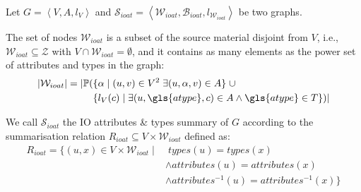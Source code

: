 \begin{definition}
	Let $G=\left\langle V, A, l_V \right\rangle$ and $\mathcal{S}_{ioat} = \left\langle \mathcal{W}_{ioat}, \mathcal{B}_{ioat}, l_{\mathcal{W}_{ioat}} \right\rangle$ be two graphs.

	The set of nodes $\mathcal{W}_{ioat}$ is a subset of the source material disjoint from $V$, i.e., $\mathcal{W}_{ioat} \subseteq \mathcal{Z}$ with $V \cap \mathcal{W}_{ioat} = \emptyset$, and it contains as many elements as the power set of attributes and types in the graph:
	$$
	\begin{aligned}
	\lvert \mathcal{W}_{ioat} \rvert = \lvert \mathbb{P} ( & \{ \alpha \mid (u, v) \in V^2\; \exists (u, \alpha, v) \in A \} \;\cup \\
	& \{ l_V(c) \mid \exists (u, \gls{atype}, c) \in A \wedge \gls{atype} \in T \} ) \rvert
	\end{aligned}
	$$

	We call $\mathcal{S}_{ioat}$ the IO attributes \& types summary of $G$ according to the summarisation relation $R_{ioat} \subseteq V \times \mathcal{W}_{ioat}$ defined as:
	$$
	\begin{aligned}
	R_{ioat} = \{ (u, x) \in V \times \mathcal{W}_{ioat} \mid &\; types(u) = types(x) \\
	& \wedge attributes(u) = attributes(x) \\
	& \wedge attributes^{-1}(u) = attributes^{-1}(x) \}
	\end{aligned}
	$$
	\label{def:ioat}
\end{definition}
\vspace{.5cm}

